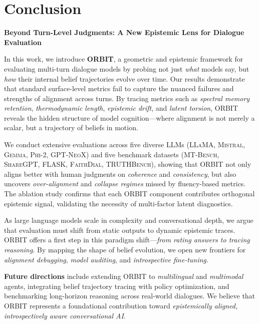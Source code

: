 \documentclass[11pt]{article}
\begin{document}
\clearpage
\newpage


\section{Conclusion}

\noindent
\textbf{Beyond Turn-Level Judgments: A New Epistemic Lens for Dialogue Evaluation}

\vspace{0.3em}
\noindent
In this work, we introduce \textbf{ORBIT}, a geometric and epistemic framework for evaluating multi-turn dialogue models by probing not just \emph{what} models say, but \emph{how} their internal belief trajectories evolve over time. Our results demonstrate that standard surface-level metrics fail to capture the nuanced failures and strengths of alignment across turns. By tracing metrics such as \emph{spectral memory retention}, \emph{thermodynamic length}, \emph{epistemic drift}, and \emph{latent torsion}, ORBIT reveals the hidden structure of model cognition—where alignment is not merely a scalar, but a trajectory of beliefs in motion.

\vspace{0.5em}
\noindent
We conduct extensive evaluations across five diverse LLMs (\textsc{LLaMA}, \textsc{Mistral}, \textsc{Gemma}, \textsc{Phi-2}, \textsc{GPT-NeoX}) and five benchmark datasets (\textsc{MT-Bench}, \textsc{ShareGPT}, \textsc{FLASK}, \textsc{FaithDial}, \textsc{TRUTHBench}), showing that ORBIT not only aligns better with human judgments on \emph{coherence} and \emph{consistency}, but also uncovers \emph{over-alignment} and \emph{collapse regimes} missed by fluency-based metrics. The ablation study confirms that each ORBIT component contributes orthogonal epistemic signal, validating the necessity of multi-factor latent diagnostics.

\vspace{0.5em}
\noindent
As large language models scale in complexity and conversational depth, we argue that evaluation must shift from static outputs to dynamic epistemic traces. ORBIT offers a first step in this paradigm shift—\emph{from rating answers to tracing reasoning}. By mapping the shape of belief evolution, we open new frontiers for \emph{alignment debugging}, \emph{model auditing}, and \emph{introspective fine-tuning}.

\vspace{0.5em}
\noindent
\textbf{Future directions} include extending ORBIT to \emph{multilingual} and \emph{multimodal} agents, integrating belief trajectory tracing with policy optimization, and benchmarking long-horizon reasoning across real-world dialogues. We believe that ORBIT represents a foundational contribution toward \emph{epistemically aligned, introspectively aware conversational AI}.
\end{document}
